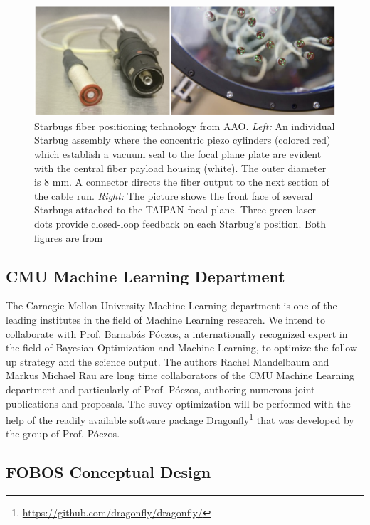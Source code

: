 \documentclass[oneside,11pt]{amsart}
\begin{document}
\begin{figure}[h!]
 \vskip -0.1in
 \includegraphics[width=\textwidth]{figs/starbugs.png}
 \caption{\small Starbugs fiber positioning technology from AAO.  {\it Left:} An individual Starbug assembly where the concentric piezo cylinders (colored red) which establish a vacuum seal to the focal plane plate are evident with the central fiber payload housing (white).  The outer diameter is 8 mm.  A connector directs the fiber output to the next section of the cable run. {\it Right:} The picture shows the front face of several Starbugs attached to the TAIPAN focal plane.  Three green laser dots provide closed-loop feedback on each Starbug's position.  Both figures are from \citet{staszak16.} }\label{fig:starbugs}
\end{figure}

\subsection{CMU Machine Learning Department}
The Carnegie Mellon University Machine Learning department is one of the leading institutes in the field of Machine Learning research. We intend to collaborate with Prof. Barnab{\'a}s P{\'o}czos, a internationally recognized expert in the field of Bayesian Optimization and Machine Learning, to optimize the follow-up strategy and the science output. The authors Rachel Mandelbaum and Markus Michael Rau are long time collaborators of the CMU Machine Learning department and particularly of Prof. P{\'o}czos, authoring numerous joint publications and proposals. The suvey optimization will be performed with the help of the readily available software package Dragonfly\footnote{\url{https://github.com/dragonfly/dragonfly/}} that was developed by the group of Prof. P{\'o}czos.



\subsection{FOBOS Conceptual Design}
\end{document}
